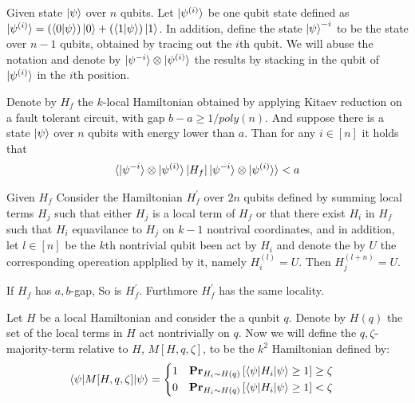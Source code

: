 \documentclass[manuscript,screen,review]{acmart}
\begin{document}
\newpage

\begin{definition}
  Given state $\ket{\psi}$ over $n$ qubits. Let $\ket{\psi^{(i)}}$ be one qubit state defined as $\ket{\psi^{(i)}} = \left( \braket{0|\psi} \right)  \ket{0} + \left( \braket{1|\psi} \right)  \ket{1}$. In addition, define the state $\ket{\psi}^{-i}$ to be the state over $n-1$ qubits, obtained by tracing out the $i$th qubit. We will abuse the notation and denote by $\ket{\psi^{-i}} \otimes \ket{\psi^{(i)}}$ the results by stacking in the qubit of $\ket{\psi^{(i)}}$ in the $i$th position. 
\end{definition}

\begin{claim} \label{claim:noisyproof}
  Denote by $H_{f}$ the $k$-local Hamiltonian obtained by applying Kitaev reduction on a fault tolerant circuit, with gap $b -a \ge 1/poly(n)$. And suppose there is a state $\ket{\psi}$ over $n$ qubits with energy lower than $a$. Than for any $i \in [n]$ it holds that 
  \begin{equation*}
    \begin{split}    
  \braket{\ket{\psi^{-i}} \otimes \ket{\psi^{(i)}}|H_{f}|\ket{\psi^{-i}} \otimes \ket{\psi^{(i)}}} < a
    \end{split}
  \end{equation*}
\end{claim}

\begin{definition} \label{definition:denseHam}
  Given $H_{f}$ Consider the Hamiltonian $H^{\prime}_{f}$ over $2n$ qubits defined by summing local terms $H_{j}$ such that either $H_{j}$ is a local term of $H_{f}$ or that there exist $H_{i}$ in $H_{f}$ such that $H_{i}$ equavilance to $H_{j}$ on $k-1$ nontrival coordinates, and in addition, let $l\in [n]$ be the $k$th nontrivial qubit been act by $H_{i}$ and denote the by $U$ the corresponding opereation applplied by it, namely $H_{i}^{(l)} = U$. Then $H_{j}^{(l + n)} = U$. 
\end{definition}

\begin{claim}
  If $H_{f}$ has $a,b$-gap, So is $H^{\prime}_{f}$. Furthmore $H^{\prime}_{f}$ has the same locality. 
\end{claim}
\begin{definition}
  Let $H$ be a local Hamiltonian and consider the a qunbit $q$. Denote by $H(q)$ the set of the local terms in $H$ act nontrivially on $q$. Now we will define the $q,\zeta$-majority-term relative to $H$, $M[H,q,\zeta]$, to be the $k^{2}$ Hamiltonian defined by: 
  \begin{equation*}
    \braket{\psi|M[H,q,\zeta]|\psi} = \begin{cases}
      \begin{split}
        & 1 & \prbm{ \braket{\psi|H_{i}|\psi} \ge 1 }{H_{i} \sim H(q)} \ge \zeta \\
        & 0 & \prbm{ \braket{\psi|H_{i}|\psi} \ge 1 }{H_{i} \sim H(q)} < \zeta 
    \end{split}
  \end{cases}
  \end{equation*}
\end{definition}
\end{document}
